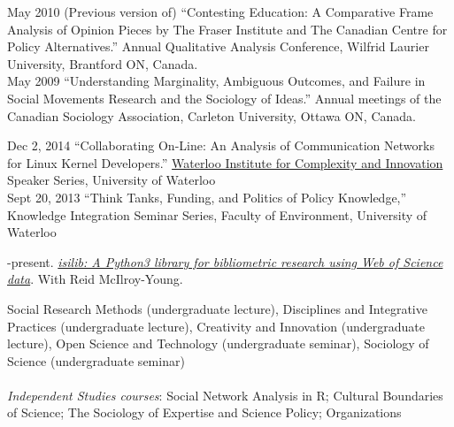 \documentclass[9pt,usenames,dvipsnames]{article}
\begin{document}
\ind May 2010 (Previous version of) ``Contesting Education: A Comparative Frame Analysis of Opinion Pieces by The Fraser Institute and The Canadian Centre for Policy Alternatives.'' Annual Qualitative Analysis Conference, Wilfrid Laurier University, Brantford ON, Canada.\\

\ind May 2009 ``Understanding Marginality, Ambiguous Outcomes, and Failure in Social Movements Research and the Sociology of Ideas.'' Annual meetings of the Canadian Sociology Association, Carleton University, Ottawa ON, Canada.\\


\ind Dec 2, 2014 ``Collaborating On-Line: An Analysis of Communication Networks for Linux Kernel Developers.'' \href{http://wici.ca/}{Waterloo Institute for Complexity and Innovation} Speaker Series, University of Waterloo \\


\ind Sept 20, 2013 ``Think Tanks, Funding, and Politics of Policy Knowledge,'' Knowledge Integration Seminar Series, Faculty of Environment, University of Waterloo \\


-present. \href{http://networkslab.org/isilib/}{\emph{isilib: A Python3 library for bibliometric research using Web of Science data}}. With Reid McIlroy-Young. \\



\noindent Social Research Methods (undergraduate lecture), Disciplines and Integrative Practices (undergraduate lecture), Creativity and Innovation (undergraduate lecture), Open Science and Technology (undergraduate seminar), Sociology of Science (undergraduate seminar) \\
\\
\noindent \emph{Independent Studies courses}: Social Network Analysis in R; Cultural Boundaries of Science; The Sociology of Expertise and Science Policy; Organizations \\ %
\\
\end{document}
